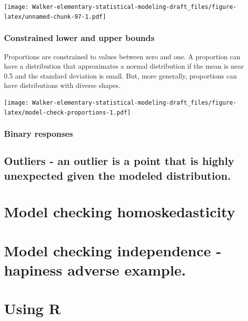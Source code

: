 \documentclass[]{book}
\begin{document}
\texttt{[image: Walker-elementary-statistical-modeling-draft\_files/figure-latex/unnamed-chunk-97-1.pdf]}

\hypertarget{constrained-lower-and-upper-bounds}{%
\subsubsection{Constrained lower and upper bounds}\label{constrained-lower-and-upper-bounds}}

Proportions are constrained to values between zero and one. A proportion can have a distribution that approximates a normal distribution if the mean is near 0.5 and the standard deviation is small. But, more generally, proportions can have distributions with diverse shapes.

\texttt{[image: Walker-elementary-statistical-modeling-draft\_files/figure-latex/model-check-proportions-1.pdf]}

\hypertarget{binary-responses}{%
\subsubsection{Binary responses}\label{binary-responses}}

\hypertarget{outliers---an-outlier-is-a-point-that-is-highly-unexpected-given-the-modeled-distribution.}{%
\subsection{Outliers - an outlier is a point that is highly unexpected given the modeled distribution.}\label{outliers---an-outlier-is-a-point-that-is-highly-unexpected-given-the-modeled-distribution.}}

\hypertarget{model-checking-homoskedasticity}{%
\section{Model checking homoskedasticity}\label{model-checking-homoskedasticity}}

\hypertarget{model-checking-independence---hapiness-adverse-example.}{%
\section{Model checking independence - hapiness adverse example.}\label{model-checking-independence---hapiness-adverse-example.}}

\hypertarget{using-r}{%
\section{Using R}\label{using-r}}
\end{document}

